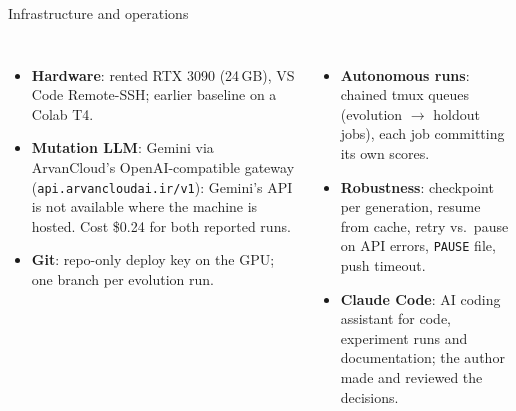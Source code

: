 \documentclass[aspectratio=169,10pt]{beamer}
\begin{document}
\begin{frame}{Infrastructure and operations}
\begin{columns}[T]
\begin{itemize}\small
  \item \textbf{Hardware}: rented RTX 3090 (24\,GB), VS Code Remote-SSH; earlier baseline on a Colab T4.
  \item \textbf{Mutation LLM}: Gemini via ArvanCloud's OpenAI-compatible gateway
        (\texttt{\footnotesize api.arvancloudai.ir/v1}): Gemini's API is not available where the machine is hosted.
        Cost \$0.24 for both reported runs.
  \item \textbf{Git}: repo-only deploy key on the GPU; one branch per evolution run.
\end{itemize}
\begin{itemize}\small
  \item \textbf{Autonomous runs}: chained tmux queues (evolution $\rightarrow$ holdout jobs), each job committing its
        own scores.
  \item \textbf{Robustness}: checkpoint per generation, resume from cache, retry vs.\ pause on API errors,
        \texttt{PAUSE} file, push timeout.
  \item \textbf{Claude Code}: AI coding assistant for code, experiment runs and documentation; the author made
        and reviewed the decisions.
\end{itemize}
\end{columns}
\end{frame}
\end{document}
